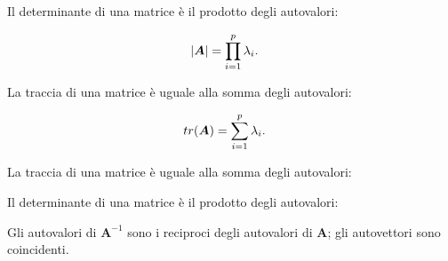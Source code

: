 \documentclass[
  11pt,
]{krantz}
\makeatletter
\newenvironment{Shaded}{\begin{snugshade}}{\end{snugshade}}
\newcommand{\AttributeTok}[1]{\textcolor[rgb]{0.61,0.61,0.61}{#1}}
\newcommand{\CommentTok}[1]{\textcolor[rgb]{0.37,0.37,0.37}{\textit{#1}}}
\newcommand{\DecValTok}[1]{\textcolor[rgb]{0.06,0.06,0.06}{#1}}
\newcommand{\FloatTok}[1]{\textcolor[rgb]{0.06,0.06,0.06}{#1}}
\newcommand{\FunctionTok}[1]{\textcolor[rgb]{0,0,0}{#1}}
\newcommand{\NormalTok}[1]{#1}
\newcommand{\OtherTok}[1]{\textcolor[rgb]{0.37,0.37,0.37}{#1}}
\newcommand{\SpecialCharTok}[1]{\textcolor[rgb]{0,0,0}{#1}}
\newenvironment{kframe}{%
\medskip{}
\setlength{\fboxsep}{.8em}
 \def\at@end@of@kframe{}%
 \ifinner\ifhmode%
  \def\at@end@of@kframe{\end{minipage}}%
  \begin{minipage}{\columnwidth}%
 \fi\fi%
 \def\FrameCommand##1{\hskip\@totalleftmargin \hskip-\fboxsep
 \colorbox{shadecolor}{##1}\hskip-\fboxsep
     \hskip-\linewidth \hskip-\@totalleftmargin \hskip\columnwidth}%
 \MakeFramed {\advance\hsize-\width
   \@totalleftmargin\z@ \linewidth\hsize
   \@setminipage}}%
 {\par\unskip\endMakeFramed%
 \at@end@of@kframe}
\renewenvironment{Shaded}{\begin{kframe}}{\end{kframe}}
\theoremstyle{definition}
\theoremstyle{definition}
\theoremstyle{definition}
\theoremstyle{definition}
\theoremstyle{remark}
\makeatother
\begin{document}
Il determinante di una matrice è il prodotto degli autovalori:

\[\begin{aligned}
    |\boldsymbol{A}| &= \prod_{i=1}^{p} \lambda_i. \notag
    \end{aligned}\]

La traccia di una matrice è uguale alla somma degli autovalori:

\[\begin{aligned}
    tr(\boldsymbol{A}) &= \sum_{i=1}^{p} \lambda_i. \notag
    \end{aligned}\]

\begin{Shaded}
\end{Shaded}

La traccia di una matrice è uguale alla somma degli autovalori:

\begin{Shaded}
\end{Shaded}

Il determinante di una matrice è il prodotto degli autovalori:

\begin{Shaded}
\end{Shaded}

Gli autovalori di \(\boldsymbol{A}^{-1}\) sono i reciproci degli autovalori di \(\boldsymbol{A}\); gli autovettori sono coincidenti.

  

\printindex
\end{document}
